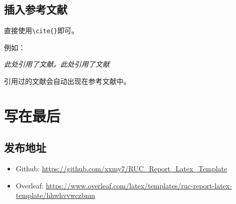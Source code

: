 \documentclass[12pt,hyperref,a4paper,UTF8]{ctexart}
\begin{document}
\subsection{插入参考文献}
直接使用\verb|\cite{}|即可。

例如：


   \textit{ 此处引用了文献\cite{0Isaac}。此处引用了文献\cite{2016The}}


引用过的文献会自动出现在参考文献中。

\section{写在最后}
\subsection{发布地址}
\begin{itemize}
    \item Github: \url{https://github.com/xxmy7/RUC_Report_Latex_Template}
    \item Overleaf:  \url{https://www.overleaf.com/latex/templates/ruc-report-latex-template/hhwhvvwczbnm}
\end{itemize}


\end{document}
